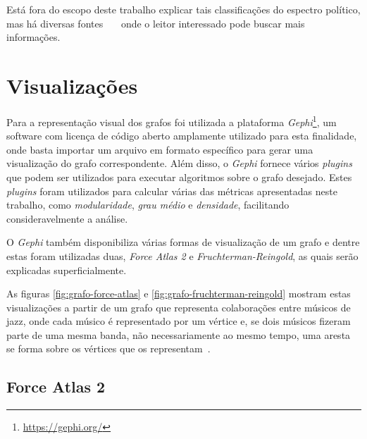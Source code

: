 
Está fora do escopo deste trabalho explicar tais classificações do espectro político, mas há diversas fontes~\cite{matos2016esquerdadireita}~\cite{silva2014conceituaccoes}~\cite{da2013partidos} onde o leitor interessado pode buscar mais informações.


\section{Visualizações}
\label{conceitos__visualizacoes}

Para a representação visual dos grafos foi utilizada a plataforma \emph{Gephi}\footnote{\url{https://gephi.org/}}, um software com licença de código aberto amplamente utilizado para esta finalidade, onde basta importar um arquivo em formato específico para gerar uma visualização do grafo correspondente. Além disso, o \emph{Gephi} fornece vários \emph{plugins} que podem ser utilizados para executar algoritmos sobre o grafo desejado. Estes \emph{plugins} foram utilizados para calcular várias das métricas apresentadas neste trabalho, como \emph{modularidade}, \emph{grau médio} e \emph{densidade}, facilitando consideravelmente a análise.

O \emph{Gephi} também disponibiliza várias formas de visualização de um grafo e dentre estas foram utilizadas duas, \emph{Force Atlas 2} e \emph{Fruchterman-Reingold}, as quais serão explicadas superficialmente.

As figuras \ref{fig:grafo-force-atlas} e \ref{fig:grafo-fruchterman-reingold} mostram estas visualizações a partir de um grafo que representa colaborações entre músicos de jazz, onde cada músico é representado por um vértice e, se dois músicos fizeram parte de uma mesma banda, não necessariamente ao mesmo tempo, uma aresta se forma sobre os vértices que os representam~\cite{gleiser2003list}.

\subsection{Force Atlas 2}
\label{conceitos__visualizacoes--force-atlas}

